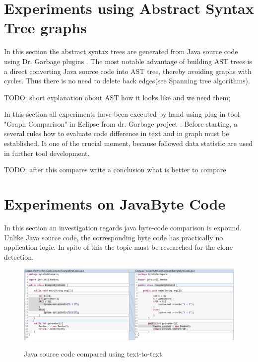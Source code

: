 \documentclass{report}
\begin{document}
\section{Experiments using Abstract Syntax Tree graphs}

In this section the abstract syntax trees are generated from Java source code using Dr. Garbage plugins \cite{drgarbage}.
The most notable advantage of building AST trees is a direct converting Java source code into AST tree, thereby avoiding graphs with cycles. Thus there is no need to delete back edges(see Spanning tree algorithms).

TODO: short explanation about AST how it looks like and we need them;

In this section all experiments have been executed by hand using plug-in tool "Graph Comparison" in Eclipse from dr. Garbage project \cite{drgarbage}.  Before starting, a several rules how to evaluate code difference in text and in graph must be established. It one of the crucial moment, because followed data statistic are used in further tool development.

TODO: after this compares write a conclusion what is better to compare



\section{Experiments on JavaByte Code}
\label{sec: java-code-experiments}

In this section an investigation regards java byte-code comparison is expound. Unlike Java source code, the corresponding byte code has practically no application logic. In spite of this the topic must be researched for the clone detection.

\begin{figure}[h]
  \centering
  \includegraphics[width=1.00\textwidth scale = 0.9]{Figures/bytecode-compare/example-of-bytecode-original-compared}\\[0.1cm]
  \caption[Functions compared by members]{Java source code compared using text-to-text}
  \label{fig:example-of-bytecode-original-compared}
\end{figure}
\end{document}

